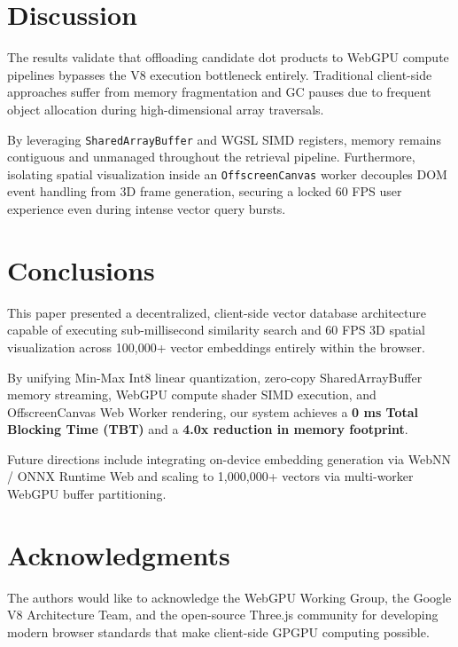 \documentclass[fleqn,10pt,lineno]{wlpeerj}
\begin{document}
\section*{Discussion}

The results validate that offloading candidate dot products to WebGPU compute pipelines bypasses the V8 execution bottleneck entirely. Traditional client-side approaches suffer from memory fragmentation and GC pauses due to frequent object allocation during high-dimensional array traversals. 

By leveraging \texttt{SharedArrayBuffer} and WGSL SIMD registers, memory remains contiguous and unmanaged throughout the retrieval pipeline. Furthermore, isolating spatial visualization inside an \texttt{OffscreenCanvas} worker decouples DOM event handling from 3D frame generation, securing a locked 60 FPS user experience even during intense vector query bursts.

\section*{Conclusions}

This paper presented a decentralized, client-side vector database architecture capable of executing sub-millisecond similarity search and 60 FPS 3D spatial visualization across 100,000+ vector embeddings entirely within the browser. 

By unifying Min-Max Int8 linear quantization, zero-copy SharedArrayBuffer memory streaming, WebGPU compute shader SIMD execution, and OffscreenCanvas Web Worker rendering, our system achieves a \textbf{0 ms Total Blocking Time (TBT)} and a \textbf{4.0x reduction in memory footprint}. 

Future directions include integrating on-device embedding generation via WebNN / ONNX Runtime Web and scaling to 1,000,000+ vectors via multi-worker WebGPU buffer partitioning.

\section*{Acknowledgments}

The authors would like to acknowledge the WebGPU Working Group, the Google V8 Architecture Team, and the open-source Three.js community for developing modern browser standards that make client-side GPGPU computing possible.


\end{document}
